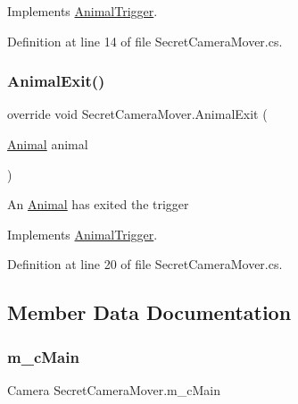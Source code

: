 Implements \mbox{\hyperlink{class_animal_trigger_a03181803fa268e0bfcbdc752ee733c40}{Animal\+Trigger}}.



Definition at line 14 of file Secret\+Camera\+Mover.\+cs.

\mbox{\label{class_secret_camera_mover_a7034d7373226a7c514d054ab73df027a}} 
\subsubsection{\texorpdfstring{Animal\+Exit()}{AnimalExit()}}
{\footnotesize\ttfamily override void Secret\+Camera\+Mover.\+Animal\+Exit (\begin{DoxyParamCaption}\item[{\mbox{\hyperlink{class_animal}{Animal}}}]{animal }\end{DoxyParamCaption})\hspace{0.3cm}{\ttfamily [virtual]}}



An \mbox{\hyperlink{class_animal}{Animal}} has exited the trigger 



Implements \mbox{\hyperlink{class_animal_trigger_aa1a7c2e90de76c2e089b2bae01813f5c}{Animal\+Trigger}}.



Definition at line 20 of file Secret\+Camera\+Mover.\+cs.



\subsection{Member Data Documentation}
\mbox{\label{class_secret_camera_mover_a2f186e49ddcd633357deffb88a8aacda}} 
\subsubsection{\texorpdfstring{m\+\_\+c\+Main}{m\_cMain}}
{\footnotesize\ttfamily Camera Secret\+Camera\+Mover.\+m\+\_\+c\+Main}



